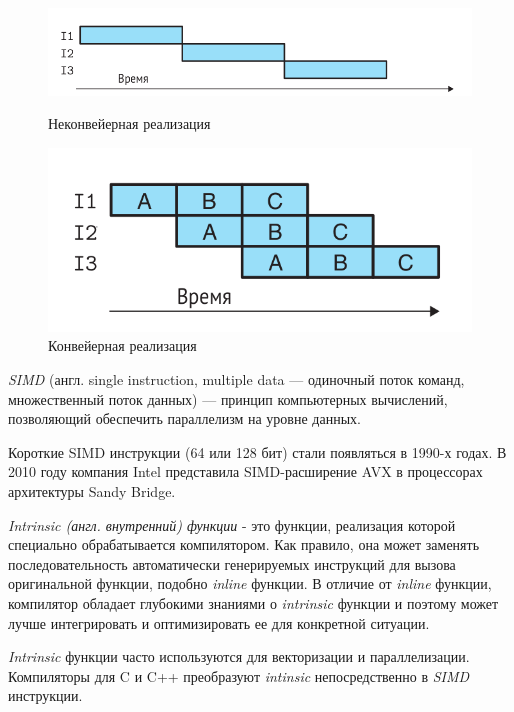 \documentclass[a4paper, 12pt]{article}
\begin{document}
\begin{figure}[!htb]
    \begin{minipage}{0.48\textwidth}
        \centering
        \includegraphics[width=1\linewidth]{scalar_example.png}
        \caption{Неконвейерная реализация}
    \end{minipage}\hfill
    \begin{minipage}{0.48\textwidth}
        \centering
        \includegraphics[width=1\linewidth]{parallel_example.png}
        \caption{Конвейерная реализация}
    \end{minipage}
\end{figure}

\textit{SIMD} (англ. single instruction, multiple data — одиночный поток команд, множественный поток данных) — принцип компьютерных вычислений, позволяющий обеспечить параллелизм на уровне данных.

Короткие SIMD инструкции (64 или 128 бит) стали появляться в 1990-х годах.
В 2010 году компания Intel представила SIMD-расширение AVX в процессорах архитектуры Sandy Bridge.

\textit{Intrinsic (англ. внутренний) функции} -  это функции, реализация которой специально обрабатывается компилятором. Как правило, она может заменять последовательность автоматически генерируемых инструкций для вызова оригинальной функции, подобно \textit{inline} функции. В отличие от \textit{inline} функции, компилятор обладает глубокими знаниями о \textit{intrinsic} функции и поэтому может лучше интегрировать и оптимизировать ее для конкретной ситуации.

\textit{Intrinsic} функции часто используются для векторизации и параллелизации. Компиляторы для C и C++ преобразуют \textit{intinsic} непосредственно в \textit{SIMD} инструкции.
\end{document}
